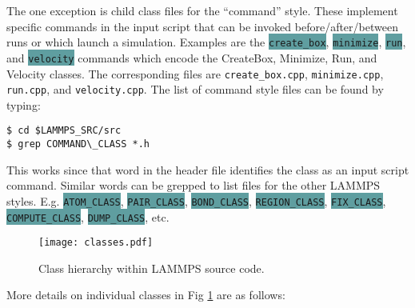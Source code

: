 \documentclass{article}
\newcommand{\path}[1]{\colorbox{light-gray}{\texttt{#1}}}
\newcommand{\code}[1]{\colorbox{cadetblue}{\color{white}\texttt{#1}}}
\begin{document}
The one exception is child class files for the ``command'' style. These
implement specific commands in the input script that can be invoked
before/after/between runs or which launch a simulation. Examples are the
\code{create\_box}, \code{minimize}, \code{run}, and \code{velocity} commands
which encode the CreateBox, Minimize, Run, and Velocity classes. The
corresponding files are \path{create\_box.cpp}, \path{minimize.cpp},
\path{run.cpp}, and \path{velocity.cpp}. The list of command style files can be
found by typing:

\begin{verbatim}
$ cd $LAMMPS_SRC/src
$ grep COMMAND\_CLASS *.h
\end{verbatim}

This works since that word in the header file identifies the class as an input
script command. Similar words can be grepped to list files for the other LAMMPS
styles. E.g. \code{ATOM\_CLASS}, \code{PAIR\_CLASS}, \code{BOND\_CLASS},
\code{REGION\_CLASS}, \code{FIX\_CLASS}, \code{COMPUTE\_CLASS},
\code{DUMP\_CLASS}, etc.

\begin{figure}[htb]
 \begin{center}
 \texttt{[image: classes.pdf]}
 \end{center}
 \caption{Class hierarchy within LAMMPS source code.}
\label{fig:classes}
\end{figure}

More details on individual classes in Fig \ref{fig:classes} are as
follows:
\end{document}
